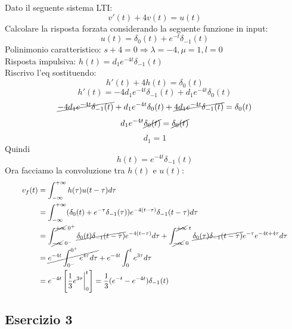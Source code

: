 \documentclass[a4paper]{article}
\begin{document}
Dato il seguente sistema LTI: 
\[v'(t) + 4v(t) = u(t)\]
Calcolare la risposta forzata considerando la seguente funzione in input:
\[u(t) = \delta_0(t) + e^{-t}\delta_{-1}(t)\]
Polinimonio caratteristico: $s + 4 = 0 \Longrightarrow \lambda = -4, \mu = 1, l = 0$\\
Risposta impulsiva: $h(t) = d_1e^{-4t}\delta_{-1}(t)$\\
Riscrivo l'eq sostituendo:
\[h'(t) + 4h(t) = \delta_0(t)\]
\[h'(t) = -4d_1e^{-4t}\delta_{-1}(t) + d_1e^{-4t}\delta_0(t)\]
\[\cancel{-4d_1e^{-4t}\delta_{-1}(t)} + d_1e^{-4t}\delta_0(t) + \cancel{4d_1e^{-4t}\delta_{-1}(t)} = \delta_0(t)\]
\[d_1e^{-4t}\cancel{\delta_0(t)} = \cancel{\delta_0(t)}\]
\[d_1 = 1\]
Quindi \[h(t) = e^{-4t}\delta_{-1}(t)\]
Ora facciamo la convoluzione tra $h(t)$ e $u(t)$:
\begin{equation*}
    \scalebox{0.9}
    {
    $\begin{aligned}
        v_f(t) &= \int_{-\infty}^{+\infty}h(\tau)u(t-\tau)d\tau\\
        &= \int_{-\infty}^{+\infty} (\delta_0(t) + e^{-\tau}\delta_{-1}(\tau))e^{-4(t-\tau)}\delta_{-1}(t-\tau)d\tau\\
        &= \int_{\cancel{-\infty} \; 0^-}^{\cancel{+\infty} \; 0^+} \cancel{\delta_0(t)\delta_{-1}(t-\tau)}e^{-4(t-\tau)}d\tau + \int_{\cancel{-\infty}\; 0}^{\cancel{+\infty} \; t} \cancel{\delta_0(\tau)\delta_{-1}(t-\tau)}e^{-\tau}e^{-4t+4\tau}d\tau \\
        &= \cancel{e^{-4t}\int_{0^-}^{0^+}e^{4\tau}d\tau} + e^{-4t}\int_{0}^{t}e^{3\tau}d\tau\\
        &= e^{-4t}\left[\frac{1}{3}e^{3\tau}\bigg|_{0}^{t}\right] = \frac{1}{3}(e^{-t} - e^{-4t})\delta_{-1}(t)
    \end{aligned}$
    }
\end{equation*}

\subsection{Esercizio 3}
\end{document}
